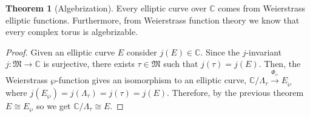 \documentclass{article}
\newcommand{\C}{\mathbb{C}}
\theoremstyle{definition}
\newtheorem{theorem}{Theorem}[section]
\begin{document}
\begin{theorem}[Algebrization]
Every elliptic curve over $\C$ comes from Weierstrass elliptic functions. Furthermore, from Weierstrass function theory we know that every complex torus is algebrizable.  
\end{theorem}

\begin{proof}
Given an elliptic curve $E$ consider $j(E) \in \C$. Since the $j$-invariant $j : \mathfrak{M} \to \C$ is surjective, there exists $\tau \in \mathfrak{M}$ such that $j(\tau) = j(E)$. Then, the Weierstrass $\wp$-function gives an isomorphism to an elliptic curve, $\C / \Lambda_{\tau} \xrightarrow{\Phi_\wp} E_\wp$ where $j(E_\wp) = j(\Lambda_{\tau}) = j(\tau) = j(E)$. Therefore, by the previous theorem $E \cong E_\wp$ so we get $\C / \Lambda_\tau \cong E$.
\end{proof}
\end{document}
